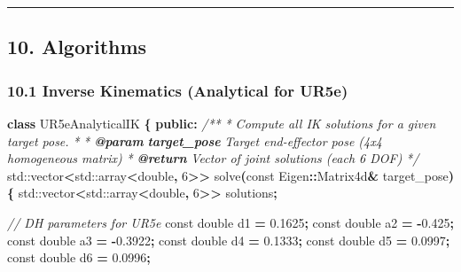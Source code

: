 \documentclass[
]{article}
\newenvironment{Shaded}{\begin{snugshade}}{\end{snugshade}}
\newcommand{\AnnotationTok}[1]{\textcolor[rgb]{0.56,0.35,0.01}{\textbf{\textit{#1}}}}
\newcommand{\AttributeTok}[1]{\textcolor[rgb]{0.13,0.29,0.53}{#1}}
\newcommand{\BuiltInTok}[1]{#1}
\newcommand{\CommentTok}[1]{\textcolor[rgb]{0.56,0.35,0.01}{\textit{#1}}}
\newcommand{\CommentVarTok}[1]{\textcolor[rgb]{0.56,0.35,0.01}{\textbf{\textit{#1}}}}
\newcommand{\DataTypeTok}[1]{\textcolor[rgb]{0.13,0.29,0.53}{#1}}
\newcommand{\DecValTok}[1]{\textcolor[rgb]{0.00,0.00,0.81}{#1}}
\newcommand{\FloatTok}[1]{\textcolor[rgb]{0.00,0.00,0.81}{#1}}
\newcommand{\KeywordTok}[1]{\textcolor[rgb]{0.13,0.29,0.53}{\textbf{#1}}}
\newcommand{\NormalTok}[1]{#1}
\newcommand{\OperatorTok}[1]{\textcolor[rgb]{0.81,0.36,0.00}{\textbf{#1}}}
\begin{document}
\begin{center}\rule{0.5\linewidth}{0.5pt}\end{center}

\hypertarget{algorithms}{%
\subsection{10. Algorithms}\label{algorithms}}

\hypertarget{inverse-kinematics-analytical-for-ur5e}{%
\subsubsection{10.1 Inverse Kinematics (Analytical for
UR5e)}\label{inverse-kinematics-analytical-for-ur5e}}

\begin{Shaded}
\begin{Highlighting}[]
\KeywordTok{class}\NormalTok{ UR5eAnalyticalIK }\OperatorTok{\{}
\KeywordTok{public}\OperatorTok{:}
    \CommentTok{/**}
\CommentTok{     * Compute all IK solutions for a given target pose.}
\CommentTok{     *}
\CommentTok{     * }\AnnotationTok{@param}\CommentTok{ }\CommentVarTok{target\_pose}\CommentTok{ Target end{-}effector pose (4x4 homogeneous matrix)}
\CommentTok{     * }\AnnotationTok{@return}\CommentTok{ Vector of joint solutions (each 6 DOF)}
\CommentTok{     */}
    \BuiltInTok{std::}\NormalTok{vector}\OperatorTok{\textless{}}\BuiltInTok{std::}\NormalTok{array}\OperatorTok{\textless{}}\DataTypeTok{double}\OperatorTok{,} \DecValTok{6}\OperatorTok{\textgreater{}\textgreater{}}\NormalTok{ solve}\OperatorTok{(}\AttributeTok{const}\NormalTok{ Eigen}\OperatorTok{::}\NormalTok{Matrix4d}\OperatorTok{\&}\NormalTok{ target\_pose}\OperatorTok{)} \OperatorTok{\{}
        \BuiltInTok{std::}\NormalTok{vector}\OperatorTok{\textless{}}\BuiltInTok{std::}\NormalTok{array}\OperatorTok{\textless{}}\DataTypeTok{double}\OperatorTok{,} \DecValTok{6}\OperatorTok{\textgreater{}\textgreater{}}\NormalTok{ solutions}\OperatorTok{;}

        \CommentTok{// DH parameters for UR5e}
        \AttributeTok{const} \DataTypeTok{double}\NormalTok{ d1 }\OperatorTok{=} \FloatTok{0.1625}\OperatorTok{;}
        \AttributeTok{const} \DataTypeTok{double}\NormalTok{ a2 }\OperatorTok{=} \OperatorTok{{-}}\FloatTok{0.425}\OperatorTok{;}
        \AttributeTok{const} \DataTypeTok{double}\NormalTok{ a3 }\OperatorTok{=} \OperatorTok{{-}}\FloatTok{0.3922}\OperatorTok{;}
        \AttributeTok{const} \DataTypeTok{double}\NormalTok{ d4 }\OperatorTok{=} \FloatTok{0.1333}\OperatorTok{;}
        \AttributeTok{const} \DataTypeTok{double}\NormalTok{ d5 }\OperatorTok{=} \FloatTok{0.0997}\OperatorTok{;}
        \AttributeTok{const} \DataTypeTok{double}\NormalTok{ d6 }\OperatorTok{=} \FloatTok{0.0996}\OperatorTok{;}


\end{Highlighting}
\end{Shaded}
\end{document}
